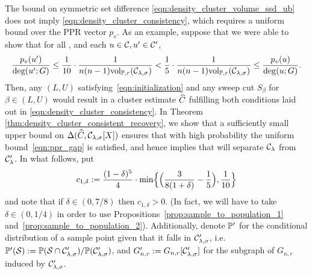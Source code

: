 The bound on symmetric set difference \eqref{eqn:density_cluster_volume_ssd_ub} does not imply \eqref{eqn:density_cluster_consistency}, which requires a
uniform bound over the PPR vector $p_v$. As an example, suppose that we were
able to show that for all , and each $u \in \mathcal{C}, u' \in \mathcal{C}'$,  
\begin{equation}
\label{eqn:ppr_gap}
\frac{p_v(u')}{\deg(u';G)} \leq \frac{1}{10} \cdot \frac{1}{n (n - 1) \mathrm{vol}_{\mathbb{P},r}(\mathcal{C}_{\lambda,\sigma})} <
\frac{1}{5} \cdot \frac{1}{n (n-1) \mathrm{vol}_{\mathbb{P},r}(\mathcal{C}_{\lambda,\sigma})} \leq \frac{p_v(u)}{\deg(u;G)}. 
\end{equation}
Then, any $(L,U)$ satisfying~\eqref{eqn:initialization} and any sweep cut
$S_{\beta}$ for $\beta \in (L,U)$ would result in a cluster estimate $\widehat{C}$ fulfilling both conditions laid out in
\eqref{eqn:density_cluster_consistency}. In Theorem 
\ref{thm:density_cluster_consistent_recovery}, we show that a sufficiently 
small upper bound on $\Delta(\widehat{C},\mathcal{C}_{\lambda,\sigma}[X])$ ensures that with high probability the uniform bound~\eqref{eqn:ppr_gap} is satisfied, and hence implies
that  will separate $\mathcal{C}_{\lambda}$ from $\mathcal{C}_{\lambda}'$. In what follows, put
\begin{equation*}
c_{1,\delta} := \frac{(1 - \delta)^5}{4} \cdot \min\Bigl\{\Bigl(\frac{3}{8(1 + \delta)} - \frac{1}{5}\Bigr),\frac{1}{10}\Bigr\}
\end{equation*}
and note that if $\delta \in (0,7/8)$ then $c_{1,\delta} > 0$. (In fact, we will have to take $\delta \in (0,1/4)$ in order to use Propositions~\ref{prop:sample_to_population_1} and~\ref{prop:sample_to_population_2}). Additionally, denote $\mathbb{P}'$ for the conditional distribution of a sample point given that it falls in $\mathcal{C}_{\lambda,\sigma}'$, i.e. $\mathbb{P}'(\mathcal{S}) := \mathbb{P}(\mathcal{S} \cap \mathcal{C}_{\lambda,\sigma}')/\mathbb{P}(\mathcal{C}_{\lambda,\sigma}')$, and $G_{n,r}' := G_{n,r}[\mathcal{C}_{\lambda,\sigma}']$ for the subgraph of $G_{n,r}$ induced by $\mathcal{C}_{\lambda,\sigma}'$. 
